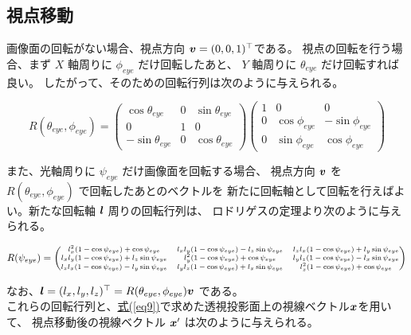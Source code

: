 \documentclass[]{jarticle}          %
\begin{document}
\subsection{視点移動}
画像面の回転がない場合、視点方向 $\mbox{\boldmath $v$}=(0,0,1)^{\top}$である。
視点の回転を行う場合、まず $X$ 軸周りに $\phi_{eye}$ だけ回転したあと、
$Y$ 軸周りに $\theta_{eye}$ だけ回転すれば良い。
したがって、そのための回転行列は次のように与えられる。

\begin{equation}
  R(\theta_{eye},\phi_{eye})=
  \begin{pmatrix}
    \cos\theta_{eye} & 0 & \sin\theta_{eye} \\
    0 & 1 & 0 \\
    -\sin\theta_{eye} & 0 &
    \cos\theta_{eye}
  \end{pmatrix}
  \begin{pmatrix}
    1 & 0 & 0 \\
    0 & \cos\phi_{eye} & 
    -\sin\phi_{eye} \\
    0 & \sin\phi_{eye} &
    \cos\phi_{eye}
  \end{pmatrix}
  \label{eq16}
\end{equation}

また、光軸周りに $\psi_{eye}$ だけ画像面を回転する場合、
視点方向 $\mbox{\boldmath $v$}$ を $R(\theta_{eye},\phi_{eye})$ で回転したあとのベクトルを
新たに回転軸として回転を行えばよい。新たな回転軸 $\mbox{\boldmath $l$}$ 周りの回転行列は、
ロドリゲスの定理より次のように与えられる。

\begin{equation}
  \scriptsize
  R(\psi_{eye})=
  \begin{pmatrix}
    l_{x}^{2}(1-\cos\psi_{eye})+\cos\psi_{eye} &
    l_{x}l_{y}(1-\cos\psi_{eye})-l_{z}\sin\psi_{eye} &
    l_{z}l_{x}(1-\cos\psi_{eye})+l_{y}\sin\psi_{eye} \\
    l_{x}l_{y}(1-\cos\psi_{eye})+l_{z}\sin\psi_{eye}&
    l_{y}^{2}(1-\cos\psi_{eye})+\cos\psi_{eye} &
    l_{y}l_{z}(1-\cos\psi_{eye})-l_{x}\sin\psi_{eye} \\
    l_{z}l_{x}(1-\cos\psi_{eye})-l_{y}\sin\psi_{eye} &
    l_{y}l_{z}(1-\cos\psi_{eye})+l_{x}\sin\psi_{eye} &
    l_{z}^{2}(1-\cos\psi_{eye})+\cos\psi_{eye}
  \end{pmatrix}
  \label{eq17}
\end{equation}

なお、$\mbox{\boldmath $l$}=(l_{x},l_{y},l_{z})^{\top}=R(\theta_{eye},\phi_{eye})\mbox{\boldmath $v$}$ である。\\
これらの回転行列と、\hyperref[eq9]{式(\ref{eq9})}で求めた透視投影面上の視線ベクトル${\mbox{\boldmath $x$}}$を用いて、
視点移動後の視線ベクトル $\mbox{\boldmath $x$}'$ は次のように与えられる。
\end{document}
